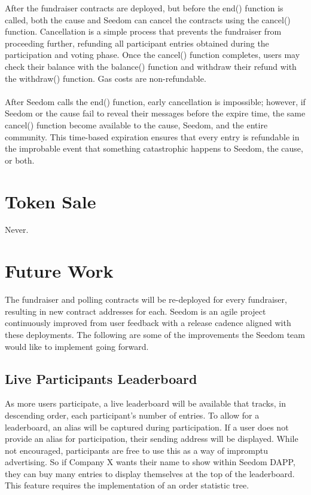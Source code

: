 \documentclass[11pt]{article}
\begin{document}
After the fundraiser contracts are deployed, but before the end() function is called, both the cause and Seedom can cancel the contracts using the cancel() function. Cancellation is a simple process that prevents the fundraiser from proceeding further, refunding all participant entries obtained during the participation and voting phase. Once the cancel() function completes, users may check their balance with the balance() function and withdraw their refund with the withdraw() function. Gas costs are non-refundable.\\\\
After Seedom calls the end() function, early cancellation is impossible; however, if Seedom or the cause fail to reveal their messages before the expire time, the same cancel() function become available to the cause, Seedom, and the entire community. This time-based expiration ensures that every entry is refundable in the improbable event that something catastrophic happens to Seedom, the cause, or both.

\section{Token Sale}
Never.

\section{Future Work}

The fundraiser and polling contracts will be re-deployed for every fundraiser, resulting in new contract addresses for each. Seedom is an agile project continuously improved from user feedback with a release cadence aligned with these deployments. The following are some of the improvements the Seedom team would like to implement going forward.

\subsection{Live Participants Leaderboard}
\label{sec:liveParticipantsLeaderboard}

As more users participate, a live leaderboard will be available that tracks, in descending order, each participant's number of entries. To allow for a leaderboard, an alias will be captured during participation. If a user does not provide an alias for participation, their sending address will be displayed. While not encouraged, participants are free to use this as a way of impromptu advertising. So if Company X wants their name to show within Seedom DAPP, they can buy many entries to display themselves at the top of the leaderboard. This feature requires the implementation of an order statistic tree.
\end{document}
